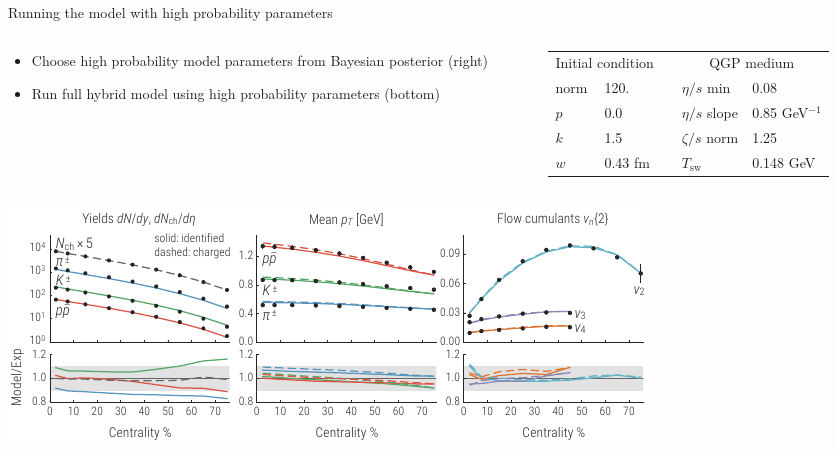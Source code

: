 \documentclass[xcolor=dvipsnames]{beamer}
\begin{document}
\begin{frame}{Running the model with high probability parameters}
    \vfill
    \centering
    \begin{columns}
        \begin{column}{0.4\textwidth}
            \scriptsize
            \begin{itemize}
                \item Choose high probability model parameters 
                      from Bayesian posterior (right)
                \smallskip
                \item Run full hybrid model using high probability 
                      parameters (bottom)
            \end{itemize}
        \end{column}
        \begin{column}{0.6\textwidth}
            \scriptsize
            \begin{tabular}{lllll}
                \multicolumn{2}{c}{Initial condition} & & 
                    \multicolumn{2}{c}{QGP medium} \\
                \noalign{\smallskip}\hline\noalign{\medskip}
                norm & 120.          &&  $\eta/s$ min   & 0.08       \\
                $p$  & 0.0           &&  $\eta/s$ slope & 0.85 GeV$^{-1}$   \\
                $k$  & 1.5           &&  $\zeta/s$ norm & 1.25       \\
                $w$  & 0.43 fm       &&  $T_\text{sw}$  & 0.148 GeV  \\
            \end{tabular}
        \end{column}
    \end{columns}
    \vspace{0.5 cm}
    \includegraphics{mode_observables}
\end{frame}
\end{document}

